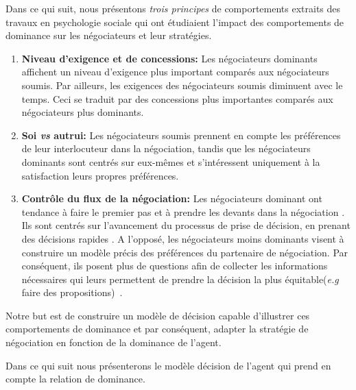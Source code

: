 	Dans ce qui suit, nous présentons \emph{trois principes} de comportements extraits des travaux en psychologie sociale qui ont étudiaient l'impact des comportements de dominance sur les négociateurs et leur stratégies.
	
	\begin{enumerate}
		\item \textbf{Niveau d'exigence et de concessions:} Les négociateurs dominants affichent un niveau d'exigence plus important comparés aux négociateurs soumis. Par ailleurs, les exigences des négociateurs soumis diminuent avec le temps. Ceci se traduit par des concessions plus importantes comparés aux négociateurs plus dominants. \cite{de1995impact}
		
		\item \textbf{Soi \emph{vs} autrui:} Les négociateurs soumis prennent en compte les préférences de leur interlocuteur dans la négociation, tandis que les négociateurs  dominants sont centrés sur eux-mêmes et s'intéressent uniquement à la satisfaction leurs propres préférences. \cite{fiske1993controlling,de1995impact}
		
		\item \textbf{Contrôle du flux de la négociation:}
		Les négociateurs dominant ont tendance à faire le premier pas et à prendre les devants dans la négociation \cite {magee2007power}. Ils sont centrés sur l'avancement du processus de prise de décision, en prenant des décisions rapides \cite{zablotskaya2012relating}.
		A l'opposé, les négociateurs moins dominants visent à construire un modèle précis des préférences du partenaire de négociation. 
		Par conséquent,  ils posent plus de questions afin de collecter les informations nécessaires qui leurs permettent de prendre la décision la plus équitable(\emph{e.g}  faire des propositions)~\cite{de2004influence}. 
		
	\end{enumerate}
	
	
	Notre but est de construire un modèle de décision capable d'illustrer ces comportements de dominance et par conséquent, adapter la stratégie de négociation en fonction de la dominance de l'agent.
	
	Dans ce qui suit nous présenterons le modèle décision de l'agent qui prend en compte la relation de dominance.
	
	
